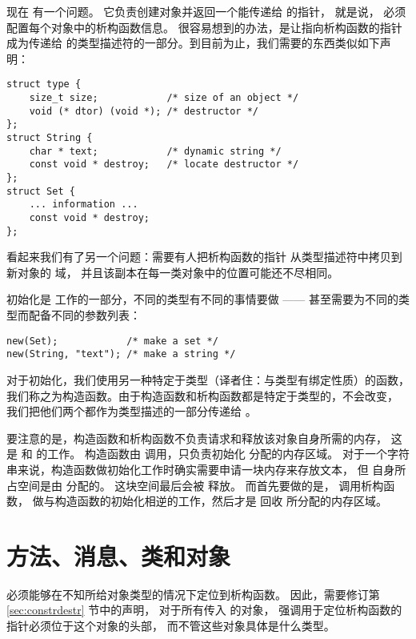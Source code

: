 现在  有一个问题。
它负责创建对象并返回一个能传递给  的指针，
就是说， 必须配置每个对象中的析构函数信息。
很容易想到的办法，是让指向析构函数的指针成为传递给 
的类型描述符的一部分。到目前为止，我们需要的东西类似如下声明：
\begin{lstlisting}
struct type {
    size_t size;            /* size of an object */
    void (* dtor) (void *); /* destructor */
};
struct String {
    char * text;            /* dynamic string */
    const void * destroy;   /* locate destructor */
};
struct Set {
    ... information ...
    const void * destroy;
};
\end{lstlisting}

看起来我们有了另一个问题：需要有人把析构函数的指针 
从类型描述符中拷贝到新对象的  域，
并且该副本在每一类对象中的位置可能还不尽相同。

初始化是  工作的一部分，不同的类型有不同的事情要做
—— 甚至需要为不同的类型而配备不同的参数列表：
\begin{lstlisting}
new(Set);            /* make a set */
new(String, "text"); /* make a string */
\end{lstlisting}

对于初始化，我们使用另一种特定于类型（译者住：与类型有绑定性质）的函数，
我们称之为构造函数。由于构造函数和析构函数都是特定于类型的，不会改变，
我们把他们两个都作为类型描述的一部分传递给 。

要注意的是，构造函数和析构函数不负责请求和释放该对象自身所需的内存，
这是  和  的工作。
构造函数由  调用，只负责初始化  分配的内存区域。
对于一个字符串来说，构造函数做初始化工作时确实需要申请一块内存来存放文本，
但  自身所占空间是由  分配的。
这块空间最后会被  释放。
而首先要做的是， 调用析构函数，
做与构造函数的初始化相逆的工作，然后才是 
回收  所分配的内存区域。

\section{方法、消息、类和对象}
\label{sec:msgcls}

 必须能够在不知所给对象类型的情况下定位到析构函数。
因此，需要修订第 \ref{sec:constrdestr} 节中的声明，
对于所有传入  的对象，
强调用于定位析构函数的指针必须位于这个对象的头部，
而不管这些对象具体是什么类型。


